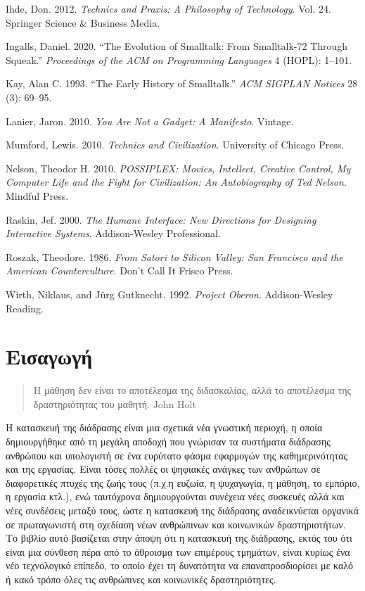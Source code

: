 \documentclass[
]{article}
\begin{document}
Ihde, Don. 2012. \emph{Technics and Praxis: A Philosophy of Technology}.
Vol. 24. Springer Science \& Business Media.

Ingalls, Daniel. 2020. {``The Evolution of Smalltalk: From Smalltalk-72
Through Squeak.''} \emph{Proceedings of the ACM on Programming
Languages} 4 (HOPL): 1--101.

Kay, Alan C. 1993. {``The Early History of Smalltalk.''} \emph{ACM
SIGPLAN Notices} 28 (3): 69--95.

Lanier, Jaron. 2010. \emph{You Are Not a Gadget: A Manifesto}. Vintage.

Mumford, Lewis. 2010. \emph{Technics and Civilization}. University of
Chicago Press.

Nelson, Theodor H. 2010. \emph{POSSIPLEX: Movies, Intellect, Creative
Control, My Computer Life and the Fight for Civilization: An
Autobiography of Ted Nelson}. Mindful Press.

Raskin, Jef. 2000. \emph{The Humane Interface: New Directions for
Designing Interactive Systems}. Addison-Wesley Professional.

Roszak, Theodore. 1986. \emph{From Satori to Silicon Valley: San
Francisco and the American Counterculture}. Don't Call It Frisco Press.

Wirth, Niklaus, and Jürg Gutknecht. 1992. \emph{Project Oberon}.
Addison-Wesley Reading.

\hypertarget{ux3b5ux3b9ux3c3ux3b1ux3b3ux3c9ux3b3ux3ae}{%
\section{Εισαγωγή}\label{ux3b5ux3b9ux3c3ux3b1ux3b3ux3c9ux3b3ux3ae}}

\begin{quote}
Η μάθηση δεν είναι το αποτέλεσμα της διδασκαλίας, αλλά το αποτέλεσμα της
δραστηριότητας του μαθητή. John Holt
\end{quote}

Η κατασκευή της διάδρασης είναι μια σχετικά νέα γνωστική περιοχή, η
οποία δημιουργήθηκε από τη μεγάλη αποδοχή που γνώρισαν τα συστήματα
διάδρασης ανθρώπου και υπολογιστή σε ένα ευρύτατο φάσμα εφαρμογών της
καθημερινότητας και της εργασίας. Είναι τόσες πολλές οι ψηφιακές ανάγκες
των ανθρώπων σε διαφορετικές πτυχές της ζωής τους (π.χ.η ευζωία, η
ψυχαγωγία, η μάθηση, το εμπόριο, η εργασία κτλ.), ενώ ταυτόχρονα
δημιουργούνται συνέχεια νέες συσκευές αλλά και νέες συνδέσεις μεταξύ
τους, ώστε η κατασκευή της διάδρασης αναδεικνύεται οργανικά σε
πρωταγωνιστή στη σχεδίαση νέων ανθρώπινων και κοινωνικών δραστηριοτήτων.
Το βιβλίο αυτό βασίζεται στην άποψη ότι η κατασκευή της διάδρασης, εκτός
του ότι είναι μια σύνθεση πέρα από το άθροισμα των επιμέρους τμημάτων,
είναι κυρίως ένα νέο τεχνολογικό επίπεδο, το οποίο έχει τη δυνατότητα να
επαναπροσδιορίσει με καλό ή κακό τρόπο όλες τις ανθρώπινες και
κοινωνικές δραστηριότητες.
\end{document}
